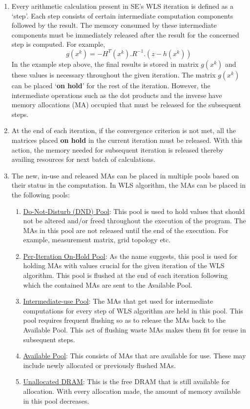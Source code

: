 \documentclass[thesis.tex]{subfiles}
\begin{document}
\begin{enumerate}
	\item Every arithmetic calculation present in SE’s WLS iteration is defined as a ‘step’. Each step consists of certain intermediate computation components followed by the result. The memory consumed by these intermediate components must be immediately released after the result for the concerned step is computed. For example,\\
	\begin{equation*}
		g(x^{k}) = -H^{T}(x^{k}).R^{-1}.(z-h(x^{k}))
	\end{equation*}
	In the example step above, the final results is stored in matrix $g(x^{k})$ and these values is necessary throughout the given iteration. The matrix $g(x^{k})$ can be placed ‘\textbf{on hold}’ for the rest of the iteration. However, the intermediate operations such as the dot products and the inverse have memory allocations (MA) occupied that must be released for the subsequent steps.
	\item At the end of each iteration, if the convergence criterion is not met, all the matrices placed \textbf{on hold} in the current iteration must be released. With this action, the memory needed for subsequent iteration is released thereby availing resources for next batch of calculations.
	\item The new, in-use and released MAs can be placed in multiple pools based on their status in the computation. In WLS algorithm, the MAs can be placed in the following pools:
		\begin{enumerate}
			\item \underline{Do-Not-Disturb (DND) Pool}: 	
				This pool is used to hold values that should not be altered and/or freed throughout the execution of the program. The MAs in this pool are not released until the end of the execution. For example, measurement matrix, grid topology etc.
			\item \underline{Per-Iteration On-Hold Pool}:
				As the name suggests, this pool is used for holding MAs with values crucial for the given iteration of the WLS algorithm. This pool is flushed at the end of each iteration following which the contained MAs are sent to the Available Pool.
			\item \underline{Intermediate-use Pool}: 
				The MAs that get used for intermediate computations for every step of WLS algorithm are held in this pool. This pool requires frequent flushing so as to release the MAs back to the Available Pool. This act of flushing waste MAs makes them fit for reuse in subsequent steps.
			\item \underline{Available Pool}: 
				This consists of MAs that are available for use. These may include newly allocated or previously flushed MAs.
			
			\item \underline{Unallocated DRAM}:
				This is the free DRAM that is still available for allocation. With every allocation made, the amount of memory available in this pool decreases.
		\end{enumerate}
\end{enumerate}
\end{document}
